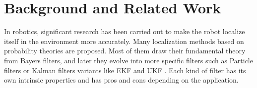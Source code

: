 \chapter{Background and Related Work\label{cha:chapter2}}

In robotics, significant research has been carried out to make the robot localize itself in the environment more accurately. Many localization methods based on probability theories are proposed. Most of them draw their fundamental theory from Bayers filters, and later they evolve into more specific filters such as Particle filters \cite{dellaert1999monte} or Kalman filters \cite{kalman1960new} variants like \gls{EKF} \cite{julier1997new} and \gls{UKF} \cite{van2001square}. Each kind of filter has its own intrinsic properties and has pros and cons depending on the application.

